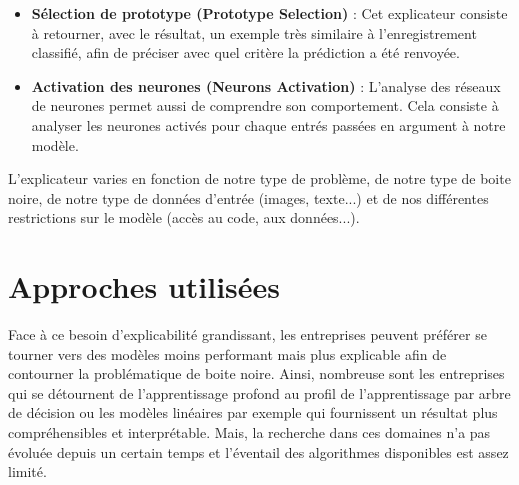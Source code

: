 \begin{itemize}
    \item \textbf{Sélection de prototype (Prototype Selection)} : Cet explicateur consiste à retourner, avec le résultat, un exemple très similaire à l'enregistrement classifié, afin de préciser avec quel critère la prédiction a été renvoyée.
    
    \item \textbf{Activation des neurones (Neurons Activation)} : L'analyse des réseaux de neurones permet aussi de comprendre son comportement. Cela consiste à analyser les neurones activés pour chaque entrés passées en argument à notre modèle.
\end{itemize}

L'explicateur varies en fonction de notre type de problème, de notre type de boite noire, de notre type de données d'entrée (images, texte...) et de nos différentes restrictions sur le modèle (accès au code, aux données...).

\section{Approches utilisées}
Face à ce besoin d'explicabilité grandissant, les entreprises peuvent préférer se tourner vers des modèles moins performant mais plus explicable afin de contourner la problématique de boite noire. Ainsi, nombreuse sont les entreprises qui se détournent de l'apprentissage profond au profil de l'apprentissage par arbre de décision ou les modèles linéaires par exemple qui fournissent un résultat plus compréhensibles et interprétable. Mais, la recherche dans ces domaines n'a pas évoluée depuis un certain temps et l'éventail des algorithmes disponibles est assez limité.

